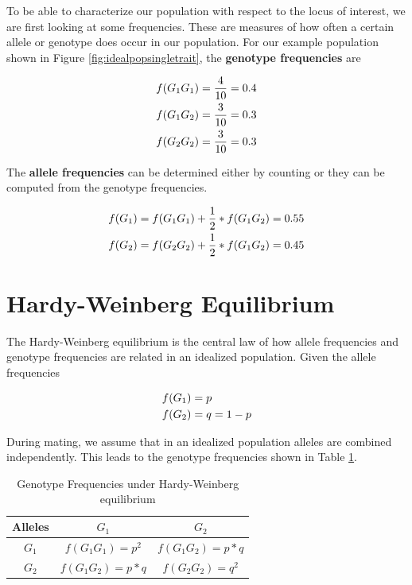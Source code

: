 \documentclass[
]{book}
\theoremstyle{definition}
\theoremstyle{definition}
\theoremstyle{definition}
\theoremstyle{remark}
\begin{document}
To be able to characterize our population with respect to the locus of interest, we are first looking at some frequencies. These are measures of how often a certain allele or genotype does occur in our population. For our example population shown in Figure \ref{fig:idealpopsingletrait}, the \textbf{genotype frequencies} are

\begin{align}
f(G_1G_1) &= \frac{4}{10} = 0.4 \notag \\
f(G_1G_2) &= \frac{3}{10} = 0.3 \notag \\
f(G_2G_2) &= \frac{3}{10} = 0.3  \label{eq:genotypefreq}
\end{align}

The \textbf{allele frequencies} can be determined either by counting or they can be computed from the genotype frequencies.

\begin{align}
f(G_1) &= f(G_1G_1) + {1\over 2}*f(G_1G_2) = 0.55 \notag \\
f(G_2) &= f(G_2G_2) + {1\over 2}*f(G_1G_2) = 0.45 \label{eq:allelefreq}
\end{align}

\hypertarget{hw-eq}{%
\section{Hardy-Weinberg Equilibrium}\label{hw-eq}}

The Hardy-Weinberg equilibrium is the central law of how allele frequencies and genotype frequencies are related in an idealized population. Given the allele frequencies

\begin{align}
f(G_1) &= p \notag \\
f(G_2) &= q = 1-p
\label{eq:allelefreq}
\end{align}

During mating, we assume that in an idealized population alleles are combined independently. This leads to the genotype frequencies shown in Table \ref{tab:tabgenfreq}.

\begin{table}

\caption{\label{tab:tabgenfreq}Genotype Frequencies under Hardy-Weinberg equilibrium}
\centering
\begin{tabular}[t]{ccc}
\toprule
Alleles & $G_1$ & $G_2$\\
\midrule
$G_1$ & $f(G_1G_1) = p^2$ & $f(G_1G_2) = p*q$\\
$G_2$ & $f(G_1G_2) = p*q$ & $f(G_2G_2) = q^2$\\
\bottomrule
\end{tabular}
\end{table}
\end{document}

